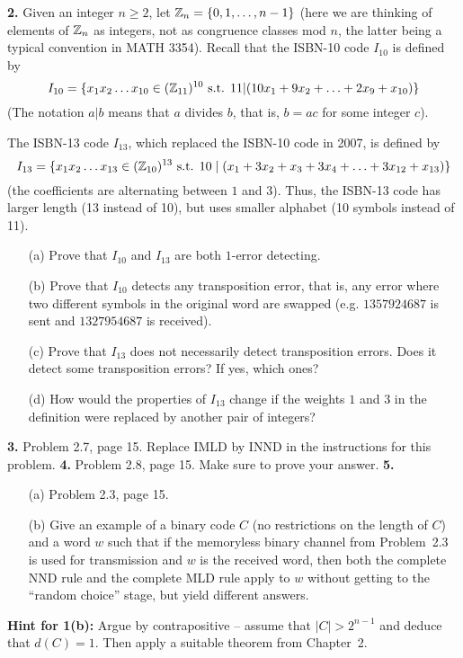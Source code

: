 \documentclass[12pt]{amsart}
\begin{document}
{\bf 2.} Given an integer $n\geq 2$, let ${\mathbb Z}_{n}=\{0,1,\ldots, n-1\}$ (here we are thinking of elements of ${\mathbb Z}_{n}$ as integers, not as congruence classes mod $n$, the latter being a typical convention in MATH 3354). Recall that the ISBN-10 code $I_{10}$ is defined by
$$I_{10}=\{x_1x_2\ldots x_{10}\in ({\mathbb Z}_{11})^{10}\mbox{ s.t. } 11 | (10x_1+9x_2+\ldots+2x_9+x_{10})\}$$
(The notation $a | b$ means that $a$ divides $b$, that is, $b=ac$ for some integer $c$).

The ISBN-13 code $I_{13}$, which replaced the ISBN-10 code in 2007, is defined by
$$I_{13}=\{x_1x_2\ldots x_{13}\in ({\mathbb Z}_{10})^{13}\mbox{ s.t. } 10\mid (x_1+3x_2+x_3+3x_4+\ldots+3x_{12}+x_{13})\}$$
(the coefficients are alternating between $1$ and $3$). Thus, the ISBN-13 code has larger length (13 instead of 10), but uses smaller alphabet (10 symbols instead of 11).
\begin{itemize}
\item[(a)] Prove that $I_{10}$ and $I_{13}$ are both $1$-error detecting.
\item[(b)] Prove that $I_{10}$ detects any transposition error, that is, any error where two different symbols in the original word are swapped (e.g.
$1357924687$ is sent and $1327954687$ is received).
\item[(c)] Prove that $I_{13}$ does not necessarily detect transposition errors. Does it detect some transposition errors? If yes, which ones?
\item[(d)] How would the properties of $I_{13}$ change if the weights $1$ and $3$ in the definition were replaced by another pair of integers?
 \end{itemize}
\skv

{\bf 3.} Problem 2.7, page 15. Replace IMLD by INND in the instructions for this problem.
\skv
{\bf 4.} Problem 2.8, page 15. Make sure to prove your answer.
\skv
{\bf 5.}
\begin{itemize} 
\item[(a)] Problem 2.3, page 15.
\item[(b)] Give an example of a binary code $C$ (no restrictions on the length of $C$) and a word $w$ such that if the memoryless binary channel from Problem~2.3 is used for transmission and $w$ is the received word, 
then both the complete NND rule and the complete MLD rule apply to $w$ without getting to the ``random choice'' stage, but yield different answers. 
\end{itemize}
\newpage
{\bf Hint for 1(b):} Argue by contrapositive -- assume that $|C|>2^{n-1}$ and deduce that $d(C)=1$. Then apply a suitable theorem from Chapter~2.
\end{document}
